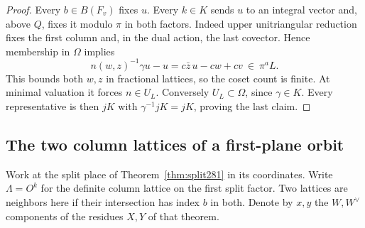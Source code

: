 \documentclass[a4paper,11pt]{article}
\theoremstyle{definition}
\theoremstyle{remark}
\numberwithin{equation}{section}
\begin{document}
\begin{proof}
Every \(b\in B(F_v)\) fixes \(u\). Every \(k\in K\) sends \(u\)
to an integral vector and, above \(Q\), fixes it modulo \(\pi\)
in both factors. Indeed upper unitriangular reduction fixes
the first column and, in the dual action, the last covector.
Hence membership in \(\Omega\) implies
\[
 n(w,z)^{-1}\gamma u-u=c\bar z\,u-cw+cv\ \in\ \pi^a L.
\]
This bounds both \(w,z\) in fractional lattices, so the
coset count is finite. At minimal valuation it forces
\(n\in U_L\). Conversely \(U_L\subset\Omega\), since
\(\gamma\in K\). Every representative is then \(jK\) with
\(\gamma^{-1}jK=jK\), proving the last claim.
\end{proof}

\subsection{The two column lattices of a first-plane orbit}\label{nav:VI-49}
Work at the split place of Theorem~\ref{thm:split281} in its
coordinates. Write \(\Lambda=O^k\) for the definite column
lattice on the first split factor. Two lattices are neighbors
here if their intersection has index \(b\) in both. Denote
by \(x,y\) the \(W,W^\vee\) components of the residues
\(X,Y\) of that theorem.
\end{document}
